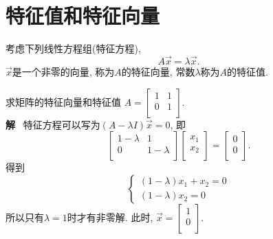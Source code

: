 
\section{特征值和特征向量}
考虑下列线性方程组(特征方程),
\begin{equation}
  A\vec{x}=\lambda \vec{x}.
\end{equation}
$\vec{x}$是一个非零的向量, 称为$A$的特征向量, 常数$\lambda$称为$A$的特征值.

\begin{example}
    求矩阵的特征向量和特征值
    $A = \begin{bmatrix}
     1 & 1\\
     0 & 1\\
    \end{bmatrix}$.
    \\
    \textbf{解}
    \ 
    特征方程可以写为$\left( A - \lambda I \right) \vec{x} = 0$, 即
    \begin{equation}
      \begin{bmatrix}
       1-\lambda & 1\\
       0 & 1-\lambda\\
      \end{bmatrix} \begin{bmatrix}
       x_1\\
       x_2\\
      \end{bmatrix} = \begin{bmatrix}
       0\\
       0\\
      \end{bmatrix}.
    \end{equation}
    得到
    \begin{equation}
      \begin{cases}
        \left( 1 - \lambda \right) x_1 + x_2 = 0
        \\
        \left( 1-\lambda \right) x_2 = 0
      \end{cases}
    \end{equation}
    所以只有$\lambda = 1$时才有非零解.
    此时, $\vec{x} = \begin{bmatrix}
     1\\
     0\\
    \end{bmatrix}$.
\end{example}

